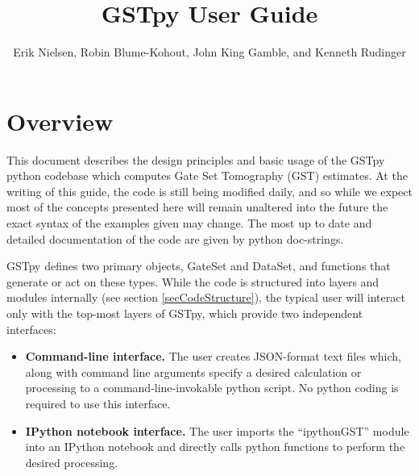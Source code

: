 \documentclass{article}[11pt]
\title{GSTpy User Guide}
\author{Erik Nielsen, Robin Blume-Kohout, John King Gamble, and Kenneth Rudinger}
\begin{document}
\maketitle

\section{Overview}
This document describes the design principles and basic usage of the GSTpy python codebase which computes Gate Set Tomography (GST) estimates.  At the writing of this guide, the code is still being modified daily, and so while we expect most of the concepts presented here will remain unaltered into the future the exact syntax of the examples given may change.  The most up to date and detailed documentation of the code are given by python doc-strings.

GSTpy defines two primary objects, GateSet and DataSet, and functions that generate or act on these types.  While the code is structured into layers and modules internally (see section \ref{secCodeStructure}), the typical user will interact only with the top-most layers of GSTpy, which provide two independent interfaces:
\begin{itemize}
\item \textbf{Command-line interface.}  The user creates JSON-format text files which, along with command line arguments specify a desired calculation or processing to a command-line-invokable python script.  No python coding is required to use this interface.
\item \textbf{IPython notebook interface.}  The user imports the ``ipythonGST'' module into an IPython notebook and directly calls python functions to perform the desired processing.
\end{itemize}
\end{document}

